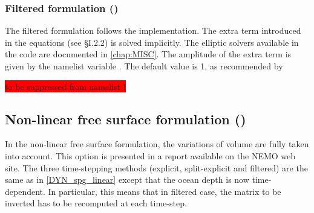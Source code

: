 \documentclass[../tex_main/NEMO_manual]{subfiles}
\begin{document}
\subsubsection{Filtered formulation (\protect{})}
\label{subsec:DYN_spg_flt}

The filtered formulation follows the \citet{Roullet2000} implementation.
The extra term introduced in the equations (see {\S}I.2.2) is solved implicitly.
The elliptic solvers available in the code are documented in \autoref{chap:MISC}.
The amplitude of the extra term is given by the namelist variable .
The default value is 1, as recommended by \citet{Roullet2000}

\colorbox{red}{ to be suppressed from namelist !}

\subsection{Non-linear free surface formulation (\protect{})}
\label{subsec:DYN_spg_vvl}

In the non-linear free surface formulation, the variations of volume are fully taken into account.
This option is presented in a report \citep{Levier2007} available on the NEMO web site.
The three time-stepping methods (explicit, split-explicit and filtered) are the same as in
\autoref{DYN_spg_linear} except that the ocean depth is now time-dependent.
In particular, this means that in filtered case, the matrix to be inverted has to be recomputed at each time-step.
\end{document}
